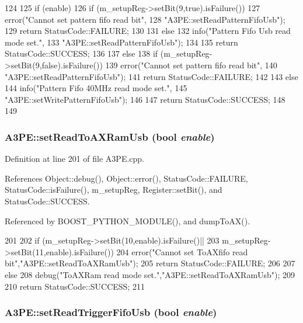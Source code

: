 \begin{DoxyCode}
124                                                  {
125   if (enable){
126     if (m_setupReg->setBit(9,true).isFailure()){
127       error("Cannot set pattern fifo read bit",
128           "A3PE::setReadPatternFifoUsb");
129       return StatusCode::FAILURE;
130     }
131     else {
132       info("Pattern Fifo Usb read mode set.",
133            "A3PE::setReadPatternFifoUsb");
134     }
135     return StatusCode::SUCCESS;
136   }
137   else {
138     if (m_setupReg->setBit(9,false).isFailure()){
139       error("Cannot set pattern fifo read bit",
140           "A3PE::setReadPatternFifoUsb");
141       return StatusCode::FAILURE;
142     }
143     else {
144       info("Pattern Fifo 40MHz read mode set.",
145            "A3PE::setWritePatternFifoUsb");
146     }
147     return StatusCode::SUCCESS;
148   }
149 }
\end{DoxyCode}
\hypertarget{classA3PE_a7ad649611d4cc5a7743db54aa3a4f943}{
\subsubsection[{setReadToAXRamUsb}]{ A3PE::setReadToAXRamUsb (bool {\em enable})}}
\label{classA3PE_a7ad649611d4cc5a7743db54aa3a4f943}


Definition at line 201 of file A3PE.cpp.

References Object::debug(), Object::error(), StatusCode::FAILURE, StatusCode::isFailure(), m\_\-setupReg, Register::setBit(), and StatusCode::SUCCESS.

Referenced by BOOST\_\-PYTHON\_\-MODULE(), and dumpToAX().


\begin{DoxyCode}
201                                              {
202   if (m_setupReg->setBit(10,enable).isFailure()||
203       m_setupReg->setBit(11,enable).isFailure()){
204     error("Cannot set ToAXfifo read bit","A3PE::setReadToAXRamUsb");
205     return StatusCode::FAILURE;
206   }
207   else {
208     debug("ToAXRam read mode set.","A3PE::setReadToAXRamUsb");
209   }
210   return StatusCode::SUCCESS;
211 }
\end{DoxyCode}
\hypertarget{classA3PE_a1d0dd1db3c493bc31aa56b55e7439e0e}{
\subsubsection[{setReadTriggerFifoUsb}]{ A3PE::setReadTriggerFifoUsb (bool {\em enable})}}
\label{classA3PE_a1d0dd1db3c493bc31aa56b55e7439e0e}


